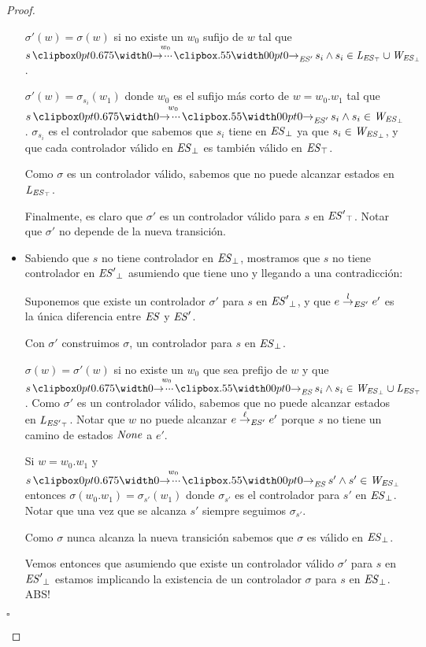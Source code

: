 \begin{proof}
\begin{itemize}
	$\sigma'(w) = \sigma(w)$ si no existe un $w_0$ sufijo de $w$ tal que $ s \runw{w_0}{\structure'} s_i \wedge s_i \in \LES \cup \WES$. 
	
	$\sigma'(w) = \sigma_{s_i}(w_1)$ donde $w_0$ es el sufijo más corto de $w = w_0.w_1$ tal que $ s \runw{w_0}{\structure'} s_i \wedge s_i \in \WES$. $\sigma_{s_i}$ es el controlador que sabemos que  $s_i$ tiene en $\mathit{{\mathit{ES}}_{\bot}}$ ya que $s_i \in \mathit{W_{\mathit{{\mathit{ES}}_{\bot}}}}$, y que cada controlador válido en $\mathit{{\mathit{ES}}_{\bot}}$ es también válido en $\mathit{{\mathit{ES}}_{\top}}$.
	
	Como $\sigma$ es un controlador válido, sabemos que no puede alcanzar estados en $\mathit{L_{\mathit{{\mathit{ES}}_{\top}}}}$.
	
	Finalmente, es claro que $\sigma'$ es un controlador válido para $s$ en $\mathit{{\mathit{ES}'}_{\top}}$. Notar que $\sigma'$ no depende de la nueva transición.
	
	
	
	
	\item Sabiendo que $s$ no tiene controlador en $\mathit{{\mathit{ES}}_{\bot}}$, mostramos que $s$ no tiene controlador en $\mathit{{\mathit{ES}'}_{\bot}}$ asumiendo que tiene uno y llegando a una contradicción:
	
	Suponemos que existe un controlador $\sigma'$ para $s$ en $\mathit{{\mathit{ES}'}_{\bot}}$, y que $e \overset{l}{\rightarrow}_{\mathit{ES}'} e'$ es la única diferencia entre $\mathit{ES}$ y $\mathit{ES}'$.
	
	Con $\sigma'$ construimos $\sigma$, un controlador para $s$ en $\mathit{{\mathit{ES}}_{\bot}}$.
	
	$\sigma(w) = \sigma'(w)$ si no existe un $w_0$ que sea prefijo de $w$ y que $s \runw{w_0}{\structure} s_i \wedge s_i \in \WES \cup \LES$. Como $\sigma'$ es un controlador válido, sabemos que no puede alcanzar estados en $\mathit{L_{\mathit{{\mathit{ES}'}_{\top}}}}$. Notar que $w$ no puede alcanzar $e \overset{\ell}{\rightarrow}_{\mathit{ES}'} e'$ porque $s$ no tiene un camino de estados $\mathit{None}$ a $e'$.
	
	Si $w=w_0.w_1$ y $s \runw{w_0}{\structure} s' \wedge s' \in \WES$ entonces $\sigma(w_0.w_1) = \sigma_{s'}(w_1)$ donde $\sigma_{s'}$ es el controlador para $s'$ en $\mathit{{\mathit{ES}}_{\bot}}$. Notar que una vez que se alcanza $s'$ siempre seguimos $\sigma_{s'}$.
	
	Como $\sigma$ nunca alcanza la nueva transición sabemos que $\sigma$ es válido en $\mathit{{\mathit{ES}}_{\bot}}$.
		
	Vemos entonces que asumiendo que existe un controlador válido $\sigma'$ para $s$ en $\mathit{{\mathit{ES}'}_{\bot}}$ estamos implicando la existencia de un controlador $\sigma$ para $s$ en $\mathit{{\mathit{ES}}_{\bot}}$. ABS! \\
	
\end{itemize}
\begin{flushright}
	$\square$
\end{flushright}
\end{proof}

